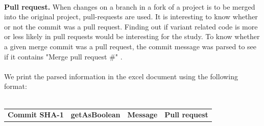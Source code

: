 \paragraph*{}
\textbf{Pull request.} When changes on a branch in a fork of a project is to be merged into the original project, pull-requests are used. It is interesting to know whether or not the commit was a pull request. Finding out if variant related code is more or less likely in pull requests would be interesting for the study. To know whether a given merge commit was a pull request, the commit message was parsed to see if it contains "Merge pull request \#" .
\paragraph*{}
We print the parsed information in the excel document using the following format:\\\\
\begin{tabular}{ l l l l}
\hline
\multicolumn{1}{c}{\textbf{Commit SHA-1}} & \multicolumn{1}{c}{\textbf{getAsBoolean}} & \multicolumn{1}{c}{\textbf{Message}} & \multicolumn{1}{c}{\textbf{Pull request}}
\end{tabular}
